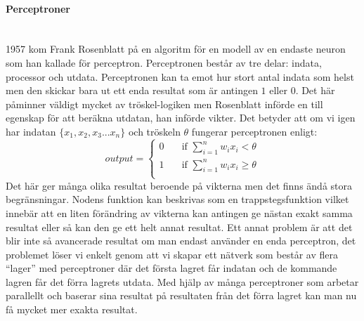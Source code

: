 \documentclass[a4paper,10pt]{article}
\begin{document}
\paragraph{Perceptroner}\hspace{0pt}\\
1957 kom Frank Rosenblatt \autocite{NNperceptron} på en algoritm för en modell av en endaste neuron som han kallade för perceptron. Perceptronen består av tre delar: indata, processor och utdata\autocite{TNC}. Perceptronen kan ta emot hur stort antal indata som helst men den skickar bara ut ett enda resultat som är antingen $1$ eller $0$. Det här påminner väldigt mycket av tröskel-logiken men Rosenblatt införde en till egenskap för att beräkna utdatan, han införde vikter. Det betyder att om vi igen har indatan 
$ \{ x_1,x_2,x_3...x_n \} $ och tröskeln $\theta$ fungerar perceptronen enligt\autocite{NNDL}:
\[output=\begin{cases}
    0  & \quad \text{if } \sum_{i=1}^{n} {w_ix_i} < \theta \\
    1  & \quad \text{if } \sum_{i=1}^{n} {w_ix_i} \geq \theta\\
  \end{cases}
\]
Det här ger många olika resultat beroende på vikterna men det finns ändå stora begränsningar. Nodens funktion kan beskrivas som en trappstegsfunktion vilket innebär att en liten förändring av vikterna kan antingen ge nästan exakt samma resultat eller så kan den ge ett helt annat resultat. Ett annat problem är att det blir inte så avancerade resultat om man endast använder en enda perceptron, det problemet löser vi enkelt genom att vi skapar ett nätverk som består av flera ``lager'' med perceptroner där det första lagret får indatan och de kommande lagren får det förra lagrets utdata. Med hjälp av många perceptroner som arbetar parallellt och baserar sina resultat på resultaten från det förra lagret kan man nu få mycket mer exakta resultat.\\\par 
\end{document}
